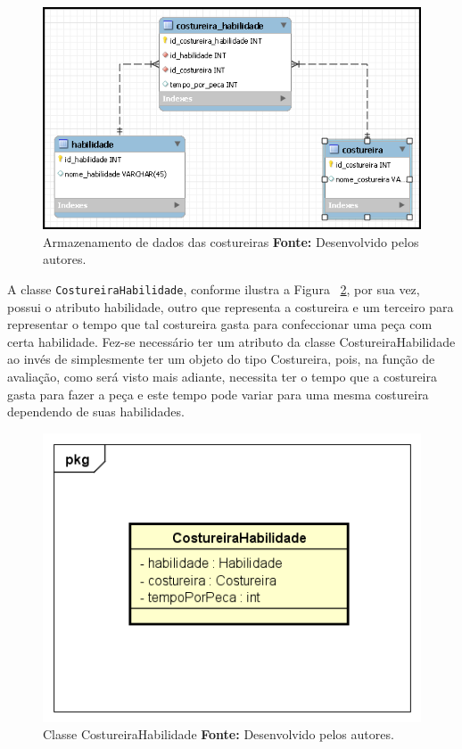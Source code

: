 \begin{figure}[h!]
	\centerline{\includegraphics[scale=0.6]{./imagens/costureira_habilidade_tabela.png}}
	\caption[Armazenamento de dados das costureiras]
	{Armazenamento de dados das costureiras \textbf{Fonte:} Desenvolvido pelos
	autores.}
	\label{fig:dados_costureiras}
\end{figure}


\par A classe \texttt{CostureiraHabilidade}, conforme ilustra a Figura
~\ref{fig:class_costureiraHabilidade}, por sua vez, possui o atributo habilidade, outro que
representa a costureira e um terceiro para representar o tempo que tal
costureira gasta para confeccionar uma peça com certa habilidade. Fez-se
necessário ter um atributo da classe CostureiraHabilidade ao invés de simplesmente ter um objeto do tipo Costureira, pois, 
na função de avaliação, como será visto mais adiante, necessita ter o tempo
que a costureira gasta para fazer a peça e este tempo pode variar para uma mesma costureira dependendo de suas habilidades.

\begin{figure}[h!]
	\centerline{\includegraphics[scale=0.9]{./imagens/costureiraHabilidade_class.png}}
	\caption[Classe CostureiraHabilidade]
	{Classe CostureiraHabilidade \textbf{Fonte:} Desenvolvido pelos autores.}
	\label{fig:class_costureiraHabilidade}
\end{figure}

